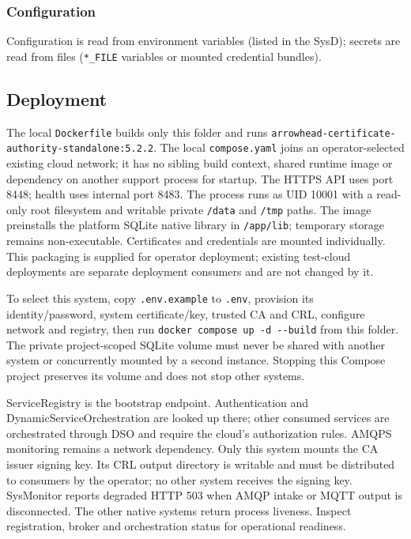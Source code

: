 \documentclass[a4paper]{arrowhead}
\begin{document}
\subsubsection{Configuration}

Configuration is read from environment variables (listed in the SysD); secrets are read from files (\texttt{*\_\allowbreak{}FILE} variables or mounted credential bundles).

\subsection{Deployment}

The local \texttt{Dockerfile} builds only this folder and runs \texttt{arrowhead-\allowbreak{}certificate-\allowbreak{}authority-\allowbreak{}standalone:5.2.2}. The local \texttt{compose.yaml} joins an operator-selected existing cloud network; it has no sibling build context, shared runtime image or dependency on another support process for startup. The HTTPS API uses port 8448; health uses internal port 8483. The process runs as UID 10001 with a read-only root filesystem and writable private \texttt{/\allowbreak{}data} and \texttt{/\allowbreak{}tmp} paths. The image preinstalls the platform SQLite native library in \texttt{/app/lib}; temporary storage remains non-executable. Certificates and credentials are mounted individually. This packaging is supplied for operator deployment; existing test-cloud deployments are separate deployment consumers and are not changed by it.

To select this system, copy \texttt{.env.example} to \texttt{.env}, provision its identity/password, system certificate/key, trusted CA and CRL, configure network and registry, then run \texttt{docker compose up -\allowbreak{}d -\allowbreak{}-\allowbreak{}build} from this folder. The private project-scoped SQLite volume must never be shared with another system or concurrently mounted by a second instance. Stopping this Compose project preserves its volume and does not stop other systems.

ServiceRegistry is the bootstrap endpoint. Authentication and DynamicServiceOrchestration are looked up there; other consumed services are orchestrated through DSO and require the cloud's authorization rules. AMQPS monitoring remains a network dependency. Only this system mounts the CA issuer signing key. Its CRL output directory is writable and must be distributed to consumers by the operator; no other system receives the signing key. SysMonitor reports degraded HTTP 503 when AMQP intake or MQTT output is disconnected. The other native systems return process liveness. Inspect registration, broker and orchestration status for operational readiness.
\end{document}
